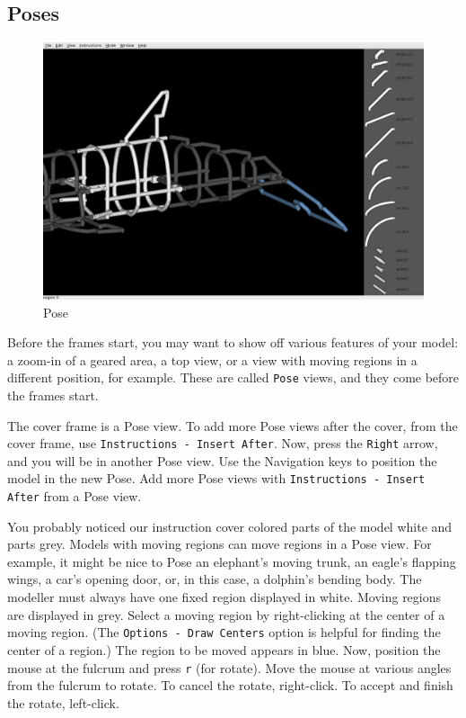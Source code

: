 \documentclass[12pt]{report}
\begin{document}
\subsection{Poses}

\begin{figure}[h]
\begin{center}
\includegraphics[width=6.38in]{doc_images/manual_instructions_pose.png}
\caption{Pose}
\label{InstructionsPose}
\end{center}
\end{figure}

Before the frames start, you may want to show off various features of
your model: a zoom-in of a geared area, a top view, or a view with
moving regions in a different position, for example.  These are called
{\tt Pose} views, and they come before the frames start.

The cover frame is a Pose view.  To add more Pose views after the
cover, from the cover frame, use {\tt Instructions - Insert After}.
Now, press the {\tt Right} arrow, and you will be in another Pose
view.  Use the Navigation keys to position the model in the new Pose.
Add more Pose views with {\tt Instructions - Insert After} from a Pose
view.

You probably noticed our instruction cover colored parts of the model
white and parts grey.  Models with moving regions can move regions in
a Pose view.  For example, it might be nice to Pose an elephant's
moving trunk, an eagle's flapping wings, a car's opening door, or, in
this case, a dolphin's bending body.  The modeller must always have
one fixed region displayed in white.  Moving regions are displayed in
grey.  Select a moving region by right-clicking at the center of a
moving region.  (The {\tt Options - Draw Centers} option is helpful for
finding the center of a region.)  The region to be moved appears in
blue.  Now, position the mouse at the fulcrum and press {\tt r} (for
rotate).  Move the mouse at various angles from the fulcrum to rotate.
To cancel the rotate, right-click.  To accept and finish the rotate,
left-click.
\end{document}
